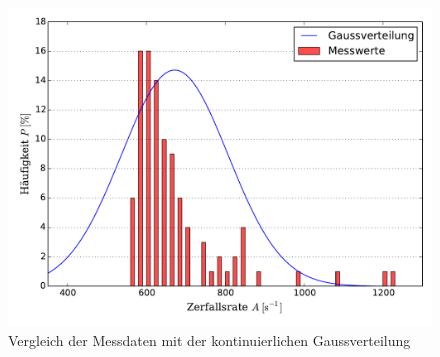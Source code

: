 	\begin{figure}[!h]
		\centering
		\includegraphics[scale=0.7]{Grafiken/VergleichGauss.pdf}
		\caption{Vergleich der Messdaten mit der kontinuierlichen Gaussverteilung}
		\label{fig:Messdaten_III_Gauss}
	\end{figure}